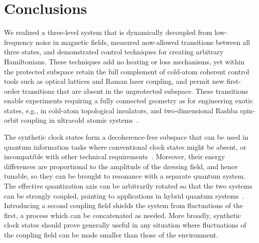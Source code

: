 \section{Conclusions}
We realized a three-level system that is dynamically decoupled from low-frequency noise in magnetic fields, measured now-allowed transitions between all three states, and demonstrated control techniques for creating arbitrary Hamiltonians.  These techniques add no heating or loss mechanisms, yet within the protected subspace retain the full complement of cold-atom coherent control tools such as optical lattices and Raman laser coupling, and permit new first-order transitions that are absent in the unprotected subspace.
These transitions enable experiments requiring a fully connected geometry as for engineering exotic states, e.g., in cold-atom topological insulators, and two-dimensional Rashba spin-orbit coupling in ultracold atomic systems~\cite{campbell_rashba_2016, juzeliunas_generalized_2010}.

The synthetic clock states form a decoherence-free subspace that can be used in quantum information tasks where conventional clock states might be absent, or incompatible with other technical requirements~\cite{bacon_universal_2000}.
Moreover, their energy differences are proportional to the amplitude of the dressing field, and hence tunable, so they can be brought to resonance with a separate quantum system.
The effective quantization axis can be arbitrarily rotated so that the two systems can be strongly coupled, pointing to applications in hybrid quantum systems~\cite{solano_chapter_2017,xiang_hybrid_2013}.
Introducing a second coupling field shields the system from fluctuations of the first, a process which can be concatenated as needed.
More broadly, synthetic clock states should prove generally useful in any situation where fluctuations of the coupling field can be made smaller than those of the environment.



